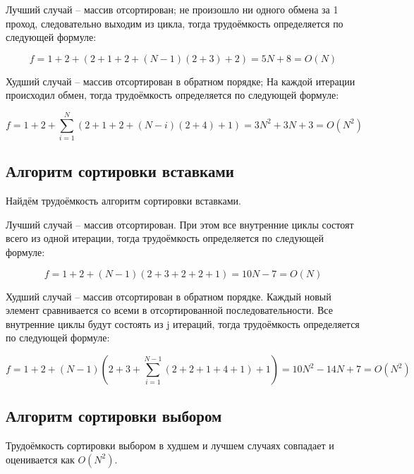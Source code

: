             Лучший случай -- массив отсортирован; 
            не произошло ни одного обмена за 1 проход,
            следовательно выходим из цикла, тогда
            трудоёмкость определяется по следующей формуле:

            \begin{equation}
                f = 1 + 2 + (2 + 1 + 2 + (N - 1) (2 + 3) + 2) = 5N + 8= O(N)
            \end{equation}

            Худший случай -- массив отсортирован в обратном порядке; 
            На каждой итерации происходил обмен, тогда
            трудоёмкость определяется по следующей формуле:

            \begin{equation}
                f = 1 + 2 + \sum_{i=1}^N (2 + 1 + 2 + (N - i)(2 + 4) + 1) = 3N^2 + 3N + 3 = O(N^2)
            \end{equation}

        \subsection{Алгоритм сортировки вставками}
            Найдём трудоёмкость алгоритм сортировки вставками.
                
            Лучший случай -- массив отсортирован. 
            При этом все внутренние циклы состоят всего из одной итерации, тогда
            трудоёмкость определяется по следующей формуле:

            \begin{equation}
                f = 1 + 2 + (N-1)(2 + 3 + 2 + 2 + 1) = 10N - 7 = O(N)
            \end{equation}

            Худший случай -- массив отсортирован в обратном порядке. 
            Каждый новый элемент сравнивается со всеми в отсортированной последовательности.
            Все внутренние циклы будут состоять из j итераций, тогда
            трудоёмкость определяется по следующей формуле:

            \begin{equation}
                f = 1 + 2 + (N-1)(2 + 3 + \sum_{i=1}^{N-1} (2 + 2 + 1 + 4 + 1) + 1) = 10N^2 - 14N + 7 = O(N^2)
            \end{equation}

        \subsection{Алгоритм сортировки выбором}
            Трудоёмкость сортировки выбором в худшем и лучшем случаях совпадает
            и оценивается как $ O(N^2) $.
